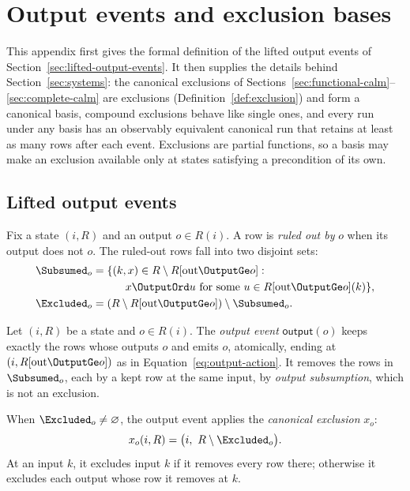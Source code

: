 \section{Output events and exclusion bases}
\label{app:bases}

This appendix first gives the formal definition of the lifted output events of
Section~\ref{sec:lifted-output-events}.  It then supplies the details behind
Section~\ref{sec:systems}: the canonical exclusions of
Sections~\ref{sec:functional-calm}--\ref{sec:complete-calm}
are exclusions (Definition~\ref{def:exclusion}) and form a canonical basis,
compound exclusions behave like single ones, and every run under any basis
has an observably equivalent canonical run that retains at least as many rows
after each event.  Exclusions are partial functions, so a basis may make an
exclusion available only at states satisfying a precondition of its own.

\subsection{Lifted output events}
\label{app:lifted-output-events}

Fix a state $(i,R)$ and an output $o\in R(i)$.  A row is \emph{ruled out by}
$o$ when its output does not \outrelbase $o$.  The ruled-out rows fall into two
disjoint sets:
\begin{align}
  \Subsumed_o&=\{(k,x)\in R\setminus R[\mathrm{out}\OutputGe o]:\notag\\
    &\qquad\quad x\OutputOrd u\text{ for some }u\in R[\mathrm{out}\OutputGe o](k)\},
      \label{eq:output-subsumptions}\\
  \Excluded_o&=(R\setminus R[\mathrm{out}\OutputGe o])\setminus\Subsumed_o.
      \label{eq:exclusion-removals}
\end{align}

\begin{definition}
\label{def:lifted-output-event}
Let $(i,R)$ be a state and $o\in R(i)$.  The \emph{output event}
$\mathsf{output}(o)$ keeps exactly the rows whose outputs \outrelbase $o$ and
emits $o$, atomically, ending at $(i,R[\mathrm{out}\OutputGe o])$ as in
Equation~\ref{eq:output-action}.  It removes the rows in $\Subsumed_o$, each
\outrelpast by a kept row at the same input, by \emph{output subsumption},
which is not an exclusion.
\end{definition}

\begin{definition}
\label{def:canonical-exclusion}
When $\Excluded_o\neq\varnothing$, the output event applies the \emph{canonical
exclusion} $x_o$:
\begin{equation}
  x_o(i,R)=\bigl(i,\ R\setminus\Excluded_o\bigr).
  \label{eq:canonical-exclusion-relational}
\end{equation}
At an input $k$, it excludes input $k$ if it removes every row there; otherwise
it excludes each output whose row it removes at $k$.
\end{definition}

